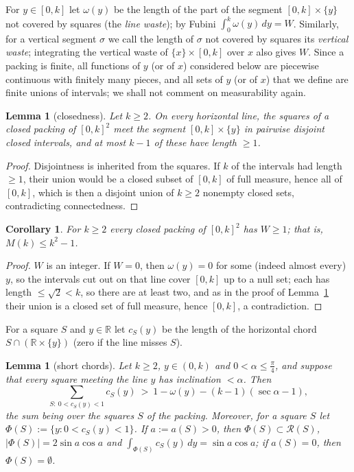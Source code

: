 \documentclass[11pt]{amsart}
\newtheorem{lemma}[theorem]{Lemma}
\newtheorem{corollary}[theorem]{Corollary}
\theoremstyle{definition}
\theoremstyle{remark}
\newcommand{\R}{\mathbb{R}}
\begin{document}
For $y\in[0,k]$ let $\omega(y)$ be the length of the part of the segment $[0,k]\times\{y\}$ not covered by squares
(the \emph{line waste}); by Fubini $\int_0^k\omega(y)\,dy=W$. Similarly, for a vertical segment $\sigma$ we call the
length of $\sigma$ not covered by squares its \emph{vertical waste}; integrating the vertical waste of
$\{x\}\times[0,k]$ over $x$ also gives $W$. Since a packing is finite, all functions of $y$ (or of $x$) considered
below are piecewise continuous with finitely many pieces, and all sets of $y$ (or of $x$) that we define are finite
unions of intervals; we shall not comment on measurability again.

\begin{lemma}[closedness]\label{lem:G}
Let $k\ge 2$. On every horizontal line, the squares of a closed packing of $[0,k]^2$ meet the segment
$[0,k]\times\{y\}$ in pairwise disjoint closed intervals, and at most $k-1$ of these have length $\ge1$.
\end{lemma}

\begin{proof}
Disjointness is inherited from the squares. If $k$ of the intervals had length $\ge 1$, their union would be a closed
subset of $[0,k]$ of full measure, hence all of $[0,k]$, which is then a disjoint union of $k\ge2$ nonempty closed
sets, contradicting connectedness.
\end{proof}

\begin{corollary}\label{cor:W1}
For $k\ge2$ every closed packing of $[0,k]^2$ has $W\ge1$; that is, $M(k)\le k^2-1$.
\end{corollary}

\begin{proof}
$W$ is an integer. If $W=0$, then $\omega(y)=0$ for some (indeed almost every) $y$, so the intervals cut out on that
line cover $[0,k]$ up to a null set; each has length $\le\sqrt2<k$, so there are at least two, and as in the proof
of Lemma~\ref{lem:G} their union is a closed set of full measure, hence $[0,k]$, a contradiction.
\end{proof}

For a square $S$ and $y\in\R$ let $c_S(y)$ be the length of the horizontal chord $S\cap(\R\times\{y\})$ (zero if the line
misses $S$).

\begin{lemma}[short chords]\label{lem:A}
Let $k\ge 2$, $y\in(0,k)$ and $0<\alpha\le\frac\pi4$, and suppose that every square meeting the line $y$ has inclination
$<\alpha$. Then
\[
\sum_{S:\ 0<c_S(y)<1}c_S(y)\ >\ 1-\omega(y)-(k-1)(\sec\alpha-1),
\]
the sum being over the squares $S$ of the packing. Moreover, for a square $S$ let $\Phi(S):=\{y:0<c_S(y)<1\}$. If
$a:=a(S)>0$, then $\Phi(S)\subset\mathcal R(S)$, $|\Phi(S)|=2\sin a\cos a$ and $\int_{\Phi(S)}c_S(y)\,dy=\sin a\cos a$; if $a(S)=0$, then
$\Phi(S)=\emptyset$.
\end{lemma}
\end{document}
